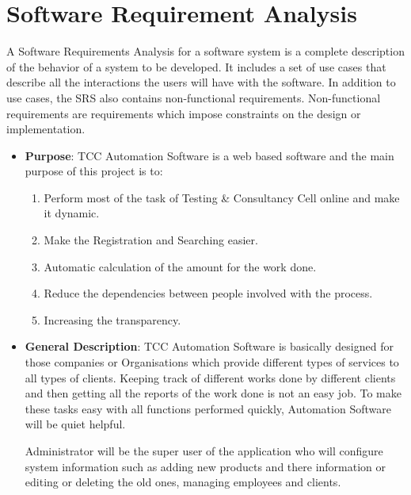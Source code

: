 \section{Software Requirement Analysis}
A Software Requirements Analysis for a software system is a complete 
description of the behavior of a system to be developed. It includes 
a set of use cases that describe all the interactions the users will 
have with the software. In addition to use cases, the SRS also contains 
non-functional requirements. Non-functional requirements are 
requirements which impose constraints on the design or implementation.
\begin{itemize}
\item{\bf Purpose}: TCC Automation Software is a web based software and the 
main purpose of this project is to:
\begin{enumerate}
\item Perform most of the task of Testing \& Consultancy Cell online 
and make it dynamic.
\item Make the Registration and Searching easier.
\item Automatic calculation of the amount for the work done.
\item Reduce the dependencies between people involved with the process.
\item Increasing the transparency.
\end{enumerate}
\item{\bf General Description}: TCC Automation Software is basically 
designed for those companies or Organisations which provide different 
types of services to all types of clients. Keeping track of different 
works done by different clients and then getting all the reports of 
the work done is not an easy job. To make these tasks easy with all 
functions performed quickly, Automation Software will be quiet helpful.

Administrator will be the super user of the application who will 
configure system information such as adding new products and there 
information or editing or deleting the old ones, managing employees 
and clients.


\end{itemize}
